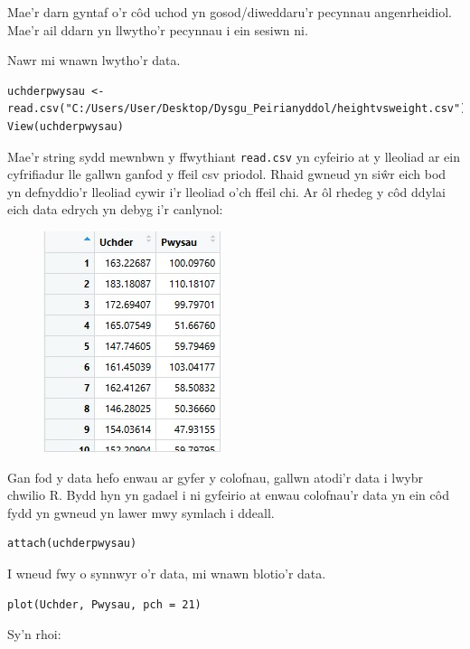 Mae'r darn gyntaf o'r c\^{o}d uchod yn gosod/diweddaru'r pecynnau angenrheidiol. Mae'r ail ddarn yn llwytho'r pecynnau i ein sesiwn ni.

Nawr mi wnawn lwytho'r data.

\begin{verbatim}
uchderpwysau <- read.csv("C:/Users/User/Desktop/Dysgu_Peirianyddol/heightvsweight.csv")
View(uchderpwysau)
\end{verbatim}

Mae'r string sydd mewnbwn y ffwythiant \texttt{read.csv} yn cyfeirio at y lleoliad ar ein cyfrifiadur lle gallwn ganfod y ffeil csv priodol. Rhaid gwneud yn si\^{w}r eich bod yn defnyddio'r lleoliad cywir i'r lleoliad o'ch ffeil chi.
Ar \^{o}l rhedeg y c\^{o}d ddylai eich data edrych yn debyg i'r canlynol: 

\begin{figure}[H]
\begin{center}
\includegraphics[width=0.35\linewidth]{../img/Data_yn_R.jpg}
\end{center}
\label{fig:DataR}
\end{figure}

Gan fod y data hefo enwau ar gyfer y colofnau, gallwn atodi'r data i lwybr chwilio R. Bydd hyn yn gadael i ni gyfeirio at enwau colofnau'r data yn ein c\^{o}d fydd yn gwneud yn lawer mwy symlach i ddeall.

\begin{verbatim}
attach(uchderpwysau)
\end{verbatim}

I wneud fwy o synnwyr o'r data, mi wnawn blotio'r data.

\begin{verbatim}
plot(Uchder, Pwysau, pch = 21)
\end{verbatim}

Sy'n rhoi:

